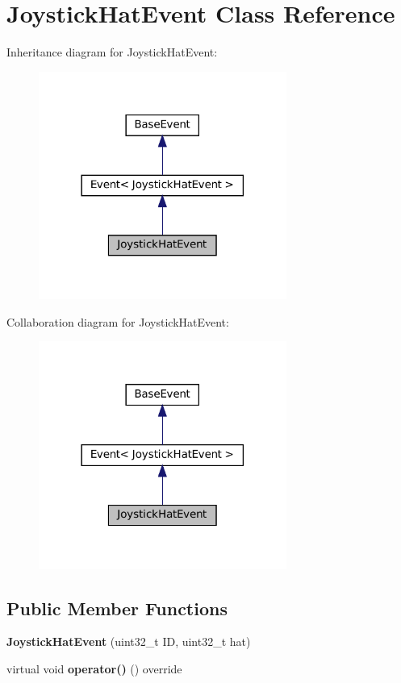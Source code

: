 \hypertarget{classJoystickHatEvent}{}\section{Joystick\+Hat\+Event Class Reference}
\label{classJoystickHatEvent}


Inheritance diagram for Joystick\+Hat\+Event\+:\nopagebreak
\begin{figure}[H]
\begin{center}
\leavevmode
\includegraphics[width=230pt]{classJoystickHatEvent__inherit__graph}
\end{center}
\end{figure}


Collaboration diagram for Joystick\+Hat\+Event\+:\nopagebreak
\begin{figure}[H]
\begin{center}
\leavevmode
\includegraphics[width=230pt]{classJoystickHatEvent__coll__graph}
\end{center}
\end{figure}
\subsection*{Public Member Functions}
\begin{DoxyCompactItemize}
\item 
\mbox{\label{classJoystickHatEvent_aae3909242d80045194e077bc250a10e3}} 
{\bfseries Joystick\+Hat\+Event} (uint32\+\_\+t ID, uint32\+\_\+t hat)
\item 
\mbox{\label{classJoystickHatEvent_aa0126e9e814d3525b3a9e01ea95613ba}} 
virtual void {\bfseries operator()} () override
\end{DoxyCompactItemize}
